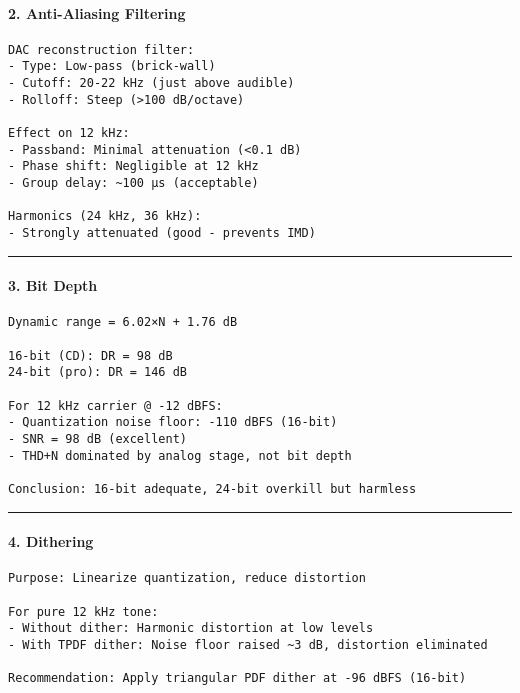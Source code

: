 \paragraph{2. Anti-Aliasing Filtering}\label{anti-aliasing-filtering}

\begin{verbatim}
DAC reconstruction filter:
- Type: Low-pass (brick-wall)
- Cutoff: 20-22 kHz (just above audible)
- Rolloff: Steep (>100 dB/octave)

Effect on 12 kHz:
- Passband: Minimal attenuation (<0.1 dB)
- Phase shift: Negligible at 12 kHz
- Group delay: ~100 µs (acceptable)

Harmonics (24 kHz, 36 kHz):
- Strongly attenuated (good - prevents IMD)
\end{verbatim}

\begin{center}\rule{0.5\linewidth}{0.5pt}\end{center}

\paragraph{3. Bit Depth}\label{bit-depth}

\begin{verbatim}
Dynamic range = 6.02×N + 1.76 dB

16-bit (CD): DR = 98 dB
24-bit (pro): DR = 146 dB

For 12 kHz carrier @ -12 dBFS:
- Quantization noise floor: -110 dBFS (16-bit)
- SNR = 98 dB (excellent)
- THD+N dominated by analog stage, not bit depth

Conclusion: 16-bit adequate, 24-bit overkill but harmless
\end{verbatim}

\begin{center}\rule{0.5\linewidth}{0.5pt}\end{center}

\paragraph{4. Dithering}\label{dithering}

\begin{verbatim}
Purpose: Linearize quantization, reduce distortion

For pure 12 kHz tone:
- Without dither: Harmonic distortion at low levels
- With TPDF dither: Noise floor raised ~3 dB, distortion eliminated

Recommendation: Apply triangular PDF dither at -96 dBFS (16-bit)
\end{verbatim}

